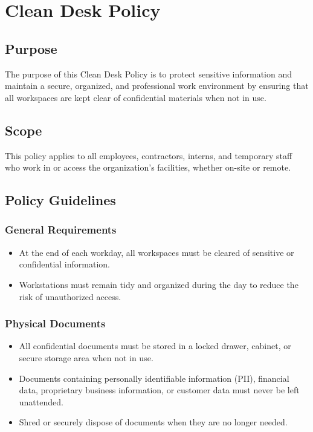 \chapter{Clean Desk Policy}
\pagestyle{fancy}

\fancyhf{}

\fancyfoot[C]{\thepage}

\renewcommand{\headrulewidth}{0pt}
\renewcommand{\footrulewidth}{0pt}

\section{Purpose}
The purpose of this Clean Desk Policy is to protect sensitive information and maintain a secure, organized, and professional work environment by ensuring that all workspaces are kept clear of confidential materials when not in use.
\section{Scope}
This policy applies to all employees, contractors, interns, and temporary staff who work in or access the organization’s facilities, whether on-site or remote.
\section{Policy Guidelines}
\subsection{General Requirements}
\begin{itemize}
    \item At the end of each workday, all workspaces must be cleared of sensitive or confidential information.
    \item Workstations must remain tidy and organized during the day to reduce the risk of unauthorized access.
\end{itemize}
\subsection{Physical Documents}
\begin{itemize}
    \item All confidential documents must be stored in a locked drawer, cabinet, or secure storage area when not in use.
    \item Documents containing personally identifiable information (PII), financial data, proprietary business information, or customer data must never be left unattended.
    \item Shred or securely dispose of documents when they are no longer needed.
\end{itemize}
